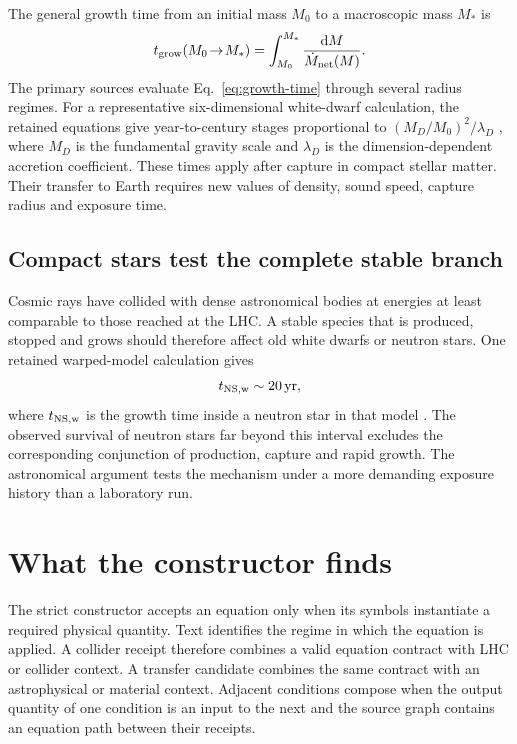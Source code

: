 \documentclass[10pt]{article}
\newcommand{\ud}{\mathrm{d}}
\newcommand{\yr}{\mathrm{yr}}
\begin{document}
The general growth time from an initial mass $M_0$ to a macroscopic mass $M_*$ is
\begin{equation}
t_{\rm grow}(M_0\!\rightarrow\!M_*)=
\int_{M_0}^{M_*}\frac{\ud M}{\dot M_{\rm net}(M)}.
\label{eq:growth-time}
\end{equation}
The primary sources evaluate Eq.~\eqref{eq:growth-time} through several radius regimes. For a representative six-dimensional white-dwarf calculation, the retained equations give year-to-century stages proportional to $(M_D/M_0)^2/\lambda_D$ \cite{GiddingsMangano2008}, where $M_D$ is the fundamental gravity scale and $\lambda_D$ is the dimension-dependent accretion coefficient. These times apply after capture in compact stellar matter. Their transfer to Earth requires new values of density, sound speed, capture radius and exposure time.

\subsection{Compact stars test the complete stable branch}

Cosmic rays have collided with dense astronomical bodies at energies at least comparable to those reached at the LHC. A stable species that is produced, stopped and grows should therefore affect old white dwarfs or neutron stars. One retained warped-model calculation gives
\begin{equation}
t_{\rm NS,w}\sim20\,\yr,
\label{eq:neutron-star}
\end{equation}
where $t_{\rm NS,w}$ is the growth time inside a neutron star in that model \cite{GiddingsMangano2008}. The observed survival of neutron stars far beyond this interval excludes the corresponding conjunction of production, capture and rapid growth. The astronomical argument tests the mechanism under a more demanding exposure history than a laboratory run.

\section{What the constructor finds}

The strict constructor accepts an equation only when its symbols instantiate a required physical quantity. Text identifies the regime in which the equation is applied. A collider receipt therefore combines a valid equation contract with LHC or collider context. A transfer candidate combines the same contract with an astrophysical or material context. Adjacent conditions compose when the output quantity of one condition is an input to the next and the source graph contains an equation path between their receipts.
\end{document}
